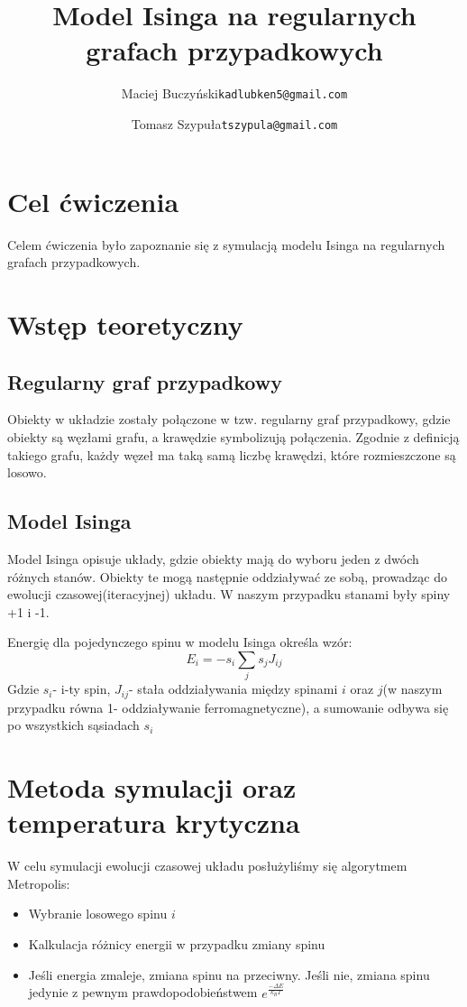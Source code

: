 \documentclass[12pt,a4paper]{article}
\author{
  Maciej Buczyński\qquad \texttt{kadlubken5@gmail.com}
  \and
  Tomasz Szypuła\qquad \texttt{tszypula@gmail.com}
}
\title{Model Isinga na regularnych grafach przypadkowych}
\begin{document}
\maketitle
\section{Cel ćwiczenia}
Celem ćwiczenia było zapoznanie się z symulacją modelu Isinga na regularnych grafach przypadkowych.

\section{Wstęp teoretyczny}
\subsection{Regularny graf przypadkowy}
Obiekty w układzie zostały połączone w tzw. regularny graf przypadkowy, gdzie obiekty są węzłami grafu, a krawędzie symbolizują połączenia. Zgodnie z definicją takiego grafu, każdy węzeł ma taką samą liczbę krawędzi, które rozmieszczone są losowo.

\subsection{Model Isinga}
Model Isinga opisuje układy, gdzie obiekty mają do wyboru jeden z dwóch różnych stanów. Obiekty te mogą następnie oddziaływać ze sobą, prowadząc do ewolucji czasowej(iteracyjnej) układu. W naszym przypadku stanami były spiny +1 i -1.

Energię dla pojedynczego spinu w modelu Isinga określa wzór:
$$ E_{i}=-s_{i}\sum_{j}s_{j}J_{ij}$$
Gdzie $s_{i}$- i-ty spin, $J_{ij}$- stała oddziaływania między spinami $i$ oraz $j$(w naszym przypadku równa 1- oddziaływanie ferromagnetyczne), a sumowanie odbywa się po wszystkich sąsiadach $s_{i}$
 
\section{Metoda symulacji oraz temperatura krytyczna}
W celu symulacji ewolucji czasowej układu posłużyliśmy się algorytmem Metropolis:
\begin{itemize}
\item Wybranie losowego spinu $i$
\item Kalkulacja różnicy energii w przypadku zmiany spinu
\item Jeśli energia zmaleje, zmiana spinu na przeciwny. Jeśli nie, zmiana spinu jedynie z pewnym prawdopodobieństwem $e^{\frac{-\Delta E}{k_{B}T}}$
\end{itemize}
\end{document}

